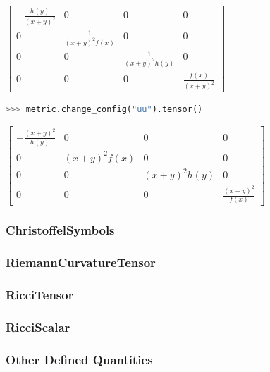\documentclass{aastex63}
\begin{document}
\begin{center}
$\displaystyle \left[\begin{matrix}- \frac{h{\left(y \right)}}{\left(x + y\right)^{2}} & 0 & 0 & 0\\0 & \frac{1}{\left(x + y\right)^{2} f{\left(x \right)}} & 0 & 0\\0 & 0 & \frac{1}{\left(x + y\right)^{2} h{\left(y \right)}} & 0\\0 & 0 & 0 & \frac{f{\left(x \right)}}{\left(x + y\right)^{2}}\end{matrix}\right]$
\end{center}

\begin{lstlisting}[language=Python, caption=Displaying the contravarint configuration of metric]
>>> metric.change_config("uu").tensor()
\end{lstlisting}

\begin{center}
 $\displaystyle \left[\begin{matrix}- \frac{\left(x + y\right)^{2}}{h{\left(y \right)}} & 0 & 0 & 0\\0 & \left(x + y\right)^{2} f{\left(x \right)} & 0 & 0\\0 & 0 & \left(x + y\right)^{2} h{\left(y \right)} & 0\\0 & 0 & 0 & \frac{\left(x + y\right)^{2}}{f{\left(x \right)}}\end{matrix}\right]$ \\
\end{center}

\subsubsection{ChristoffelSymbols}\label{subsubsec:chl}
\subsubsection{RiemannCurvatureTensor}\label{subsubsec:riemann}
\subsubsection{RicciTensor}\label{subsubsec:riccitensor}
\subsubsection{RicciScalar}\label{subsubsec:ricciscalar}
\subsubsection{Other Defined Quantities}\label{subsubsec:other}
\end{document}
